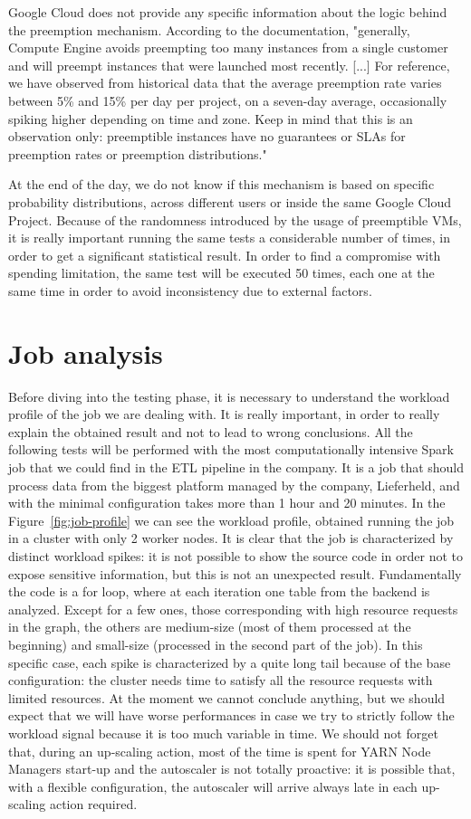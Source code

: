 \documentclass[12pt,twoside,cucitura]{toptesi}
\begin{document}
Google Cloud does not provide any specific information about the logic behind the preemption mechanism. According to the documentation, "generally, Compute Engine avoids preempting too many instances from a single customer and will preempt instances that were launched most recently. [...] For reference, we have observed from historical data that the average preemption rate varies between 5\% and 15\% per day per project, on a seven-day average, occasionally spiking higher depending on time and zone. Keep in mind that this is an observation only: preemptible instances have no guarantees or SLAs for preemption rates or preemption distributions."

At the end of the day, we do not know if this mechanism is based on specific probability distributions, across different users or inside the same Google Cloud Project. Because of the randomness introduced by the usage of preemptible VMs, it is really important running the same tests a considerable number of times, in order to get a significant statistical result. In order to find a compromise with spending limitation, the same test will be executed 50 times, each one at the same time in order to avoid inconsistency due to external factors.

\section{Job analysis}
Before diving into the testing phase, it is necessary to understand the workload profile of the job we are dealing with. It is really important, in order to really explain the obtained result and not to lead to wrong conclusions. All the following tests will be performed with the most computationally intensive Spark job that we could find in the ETL pipeline in the company. It is a job that should process data from the biggest platform managed by the company, Lieferheld, and with the minimal configuration takes more than 1 hour and 20 minutes. In the Figure~\ref{fig:job-profile} we can see the workload profile, obtained running the job in a cluster with only 2 worker nodes. It is clear that the job is characterized by distinct workload spikes: it is not possible to show the source code in order not to expose sensitive information, but this is not an unexpected result. Fundamentally the code is a for loop, where at each iteration one table from the backend is analyzed. Except for a few ones, those corresponding with high resource requests in the graph, the others are medium-size (most of them processed at the beginning) and small-size (processed in the second part of the job). In this specific case, each spike is characterized by a quite long tail because of the base configuration: the cluster needs time to satisfy all the resource requests with limited resources. At the moment we cannot conclude anything, but we should expect that we will have worse performances in case we try to strictly follow the workload signal because it is too much variable in time. We should not forget that, during an up-scaling action, most of the time is spent for YARN Node Managers start-up and the autoscaler is not totally proactive: it is possible that, with a flexible configuration, the autoscaler will arrive always late in each up-scaling action required.
\end{document}
